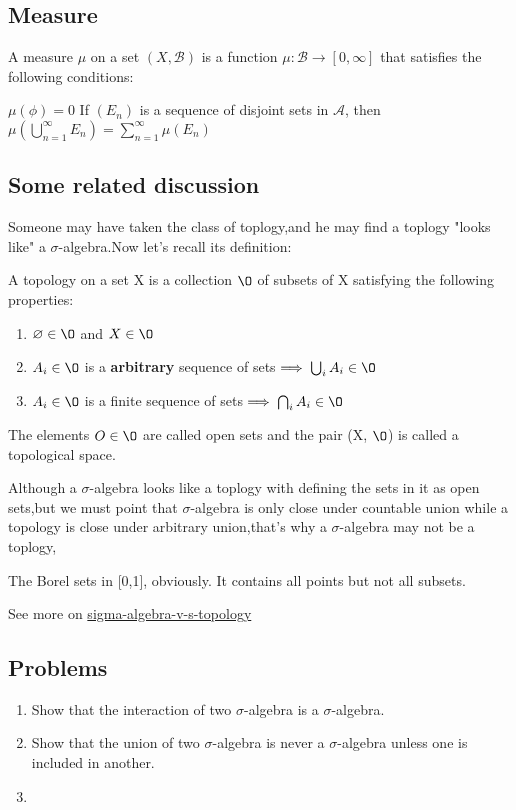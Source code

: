 \subsection{Measure}
A measure $\mu$ on a set $(X,\mathcal{B})$ is a function $\mu: \mathcal{B} \rightarrow [0,\infty]$ that satisfies the following conditions:

$\mu(\phi) = 0$
If $(E_n)$ is a sequence of disjoint sets in $\mathcal{A}$, then $\mu\left(\bigcup_{n=1}^\infty E_n\right) = \sum_{n=1}^\infty \mu(E_n)$
\subsection{Some related discussion}

Someone may have taken the class of toplogy,and he may find a toplogy "looks like" a $\sigma$-algebra.Now let's recall its definition:\\ [10pt]
\begin{definition}[topology]
    A topology on a set X is a collection $\O$ of subsets of X satisfying
the following properties:\smallbreak
\begin{enumerate}
    \item $\varnothing \in \O $ and $ X \in \O$
    \item $A_i \in \O$ is a \textbf{arbitrary} sequence of sets$\implies \bigcup_i A_i \in \O$
    \item $A_i \in \O$ is a finite sequence of sets$\implies \bigcap_i A_i \in \O$
\end{enumerate}
\end{definition}
    The elements $O \in \O$ are called open sets and the pair (X, $\O$) is called a topological
space.

    Although a $\sigma$-algebra looks like a toplogy with defining the sets in it as open sets,but 
we must point that $\sigma$-algebra is only close under countable union while a topology is close under
arbitrary union,that's why a $\sigma$-algebra may not be a toplogy,

\begin{example}
    The Borel sets in [0,1], obviously. It contains all points but not all subsets.
\end{example}
    See more on \href{https://math.stackexchange.com/questions/2887034/sigma-algebra-v-s-topology}{sigma-algebra-v-s-topology}

\newpage
\subsection*{Problems}

\begin{enumerate}
    \item Show that the interaction of two $\sigma$-algebra is a $\sigma$-algebra.\smallskip
    \item Show that the union of two $\sigma$-algebra is never a $\sigma$-algebra unless one is included in another.\smallskip
    \item 
\end{enumerate}

